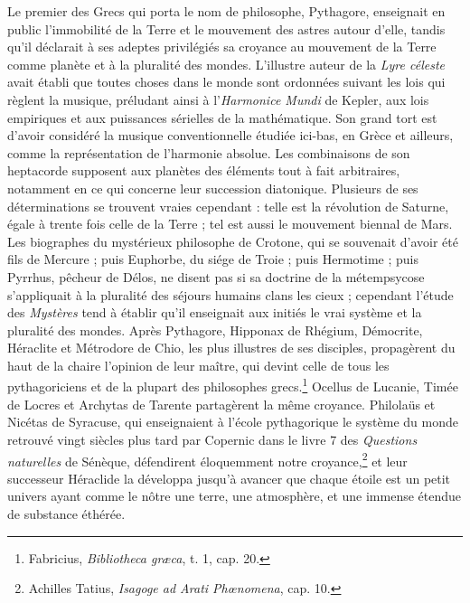 \documentclass[a4paper, 11pt, oneside, landscape]{article}
\begin{document}
Le premier des Grecs qui porta le nom de philosophe, Pythagore, enseignait en public l'immobilité de la Terre et le mouvement des astres autour d'elle, tandis qu'il déclarait à ses adeptes privilégiés sa croyance au mouvement de la Terre comme planète et à la pluralité des mondes. L'illustre auteur de la \emph{Lyre céleste} avait établi que toutes choses dans le monde sont ordonnées suivant les lois qui règlent la musique, préludant ainsi à l'\emph{Harmonice Mundi} de Kepler, aux lois empiriques et aux puissances sérielles de la mathématique. Son grand tort est d'avoir considéré la musique conventionnelle étudiée ici-bas, en Grèce et ailleurs, comme la représentation de l'harmonie absolue. Les combinaisons de son heptacorde supposent aux planètes des éléments tout à fait arbitraires, notamment en ce qui concerne leur succession diatonique. Plusieurs de ses déterminations se trouvent vraies cependant : telle est la révolution de Saturne, égale à trente fois celle de la Terre ; tel est aussi le mouvement biennal de Mars. Les biographes du mystérieux philosophe de Crotone, qui se souvenait d'avoir été fils de Mercure ; puis Euphorbe, du siége de Troie ; puis Hermotime ; puis Pyrrhus, pêcheur de Délos, ne disent pas si sa doctrine de la métempsycose s'appliquait à la pluralité des séjours humains clans les cieux ; cependant l'étude des \emph{Mystères} tend à établir qu'il enseignait aux initiés le vrai système et la pluralité des mondes. Après Pythagore, Hipponax de Rhégium, Démocrite, Héraclite et Métrodore de Chio, les plus illustres de ses disciples, propagèrent du haut de la chaire l'opinion de leur maître, qui devint celle de tous les pythagoriciens et de la plupart des philosophes grecs.\footnote{Fabricius, \emph{Bibliotheca græca}, t. 1, cap. 20.} Ocellus de Lucanie, Timée de Locres et Archytas de Tarente partagèrent la même croyance. Philolaüs et Nicétas de Syracuse, qui enseignaient à l'école pythagorique le système du monde retrouvé vingt siècles plus tard par Copernic dans le livre 7 des \emph{Questions naturelles} de Sénèque, défendirent éloquemment notre croyance,\footnote{Achilles Tatius, \emph{Isagoge ad Arati Phœnomena}, cap. 10.} et leur successeur Héraclide la développa jusqu'à avancer que chaque étoile est un petit univers ayant comme le nôtre une terre, une atmosphère, et une immense étendue de substance éthérée.
\end{document}
